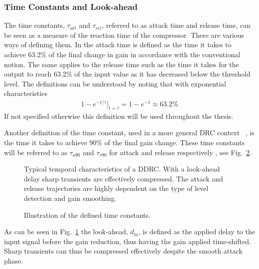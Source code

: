 \documentclass[../main2.tex]{subfiles}
\providecommand{\rootdir}{..}
\begin{document}
\subsubsection{Time Constants and Look-ahead}
The time constants, $\tau_{att}$ and $\tau_{rel}$, referred to as attack time and release time, can be seen as a measure of the reaction time of the compressor. There are various ways of defining them. In \cite{mcnally1984dynamic} the attack time is defined as the time it takes to achieve 63.2\% of the final change in gain in accordance with the conventional notion. The same applies to the release time such as the time it takes for the output to reach 63.2\% of the input value as it has decreased below the threshold level. The definitions can be understood by noting that with exponential characteristics
\begin{align}
1-e^{-t / \tau}\rvert_{t=\tau} = 1-e^{-1} \approx 63.2\% \label{eq:time_const}
\end{align}
If not specified otherwise this definition will be used throughout the thesis.

Another definition of the time constant, used in a more general DRC context ~\cite{mcnally1984dynamic}, is the time it takes to achieve 90\% of the final gain change. These time constants will be referred to as $\tau_{a90}$ and $\tau_{r90}$ for attack and release respectively , see Fig.~\ref{fig:time_constants}.
\begin{figure}
\centerline{}
\caption{Typical temporal characteristics of a DDRC. With a look-ahead delay sharp transients are effectively compressed. The attack and release trajectories are highly dependent on the type of level detection and gain smoothing.}
\label{fig:typical_envelope_detailed}
\end{figure}
\begin{figure}
\centerline{}
\caption{Illustration of the defined time constants.}
\label{fig:time_constants}
\end{figure}
As can be seen in Fig.~\ref{fig:typical_envelope_detailed} the look-ahead, $d_{la}$, is defined as the applied delay to the input signal before the gain reduction, thus having the gain applied time-shifted. Sharp transients can thus be compressed effectively despite the smooth attack phase.
\end{document}
